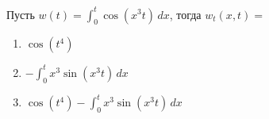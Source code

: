 Пусть \(w\left(t\right)=\int_{0}^{t}\cos\left(x^3t\right)\,dx\), тогда \(w_t\left(x,t\right)=\)

\begin{enumerate}[label=\arabic*)]
    \item \(\cos\left(t^4\right)\)
    \item \(-\int_{0}^{t}x^3\sin\left(x^3t\right)\,dx\)
    \item \(\cos\left(t^4\right)-\int_{0}^{t}x^3\sin\left(x^3t\right)\,dx\)
\end{enumerate}

